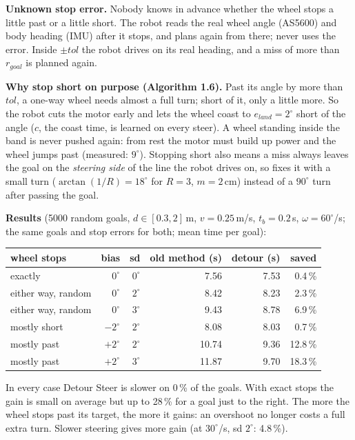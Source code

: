 \documentclass[11pt,a4paper]{article}
\begin{document}
{\noindent\textbf{Unknown stop error.} Nobody knows in advance whether the wheel stops a little past or a
little short. The robot reads the real wheel angle (AS5600) and body heading (IMU) after it stops, and
\FDetourSteer{} plans again from there; \FPlan{} never uses the error. Inside $\pm tol$ the robot drives on
its real heading, and a miss of more than $r_{goal}$ is planned again.

\smallskip
\noindent\textbf{Why stop short on purpose (Algorithm 1.6).} Past its angle by more than $tol$, a one-way wheel
needs almost a full turn; short of it, only a little more. So the robot cuts the motor early and lets the
wheel coast to $e_{land} = 2^\circ$ short of the angle ($c$, the coast time, is learned on every steer). A
wheel standing inside the band is never pushed again: from rest the motor must build up power and the
wheel jumps past (measured: $9^\circ$). Stopping short also means a miss always leaves the goal on the
\emph{steering side} of the line the robot drives on, so \FDriveReaim{} fixes it with a small turn
($\arctan(1/R) = 18^\circ$ for $R = 3$, $m = 2$\,cm) instead of a $90^\circ$ turn after passing the goal.

\smallskip
\noindent\textbf{Results} (5000 random goals, $d \in [0.3, 2]$\,m, $v = 0.25$\,m/s, $t_b = 0.2$\,s,
$\omega = 60^\circ$/s; the same goals and stop errors for both; mean time per goal):
\begin{center}
\begin{tabular}{lrrrrr}
\toprule
wheel stops & bias & sd & old method (s) & detour (s) & saved \\
\midrule
exactly             & $0^\circ$  & $0^\circ$ &  7.56 & 7.53 &  0.4\,\% \\
either way, random  & $0^\circ$  & $2^\circ$ &  8.42 & 8.23 &  2.3\,\% \\
either way, random  & $0^\circ$  & $3^\circ$ &  9.43 & 8.78 &  6.9\,\% \\
mostly short        & $-2^\circ$ & $2^\circ$ &  8.08 & 8.03 &  0.7\,\% \\
mostly past         & $+2^\circ$ & $2^\circ$ & 10.74 & 9.36 & 12.8\,\% \\
mostly past         & $+2^\circ$ & $3^\circ$ & 11.87 & 9.70 & 18.3\,\% \\
\bottomrule
\end{tabular}
\end{center}
\noindent In every case Detour Steer is slower on 0\,\% of the goals. With exact stops the gain is small on
average but up to 28\,\% for a goal just to the right. The more the wheel stops past its target, the more it
gains: an overshoot no longer costs a full extra turn. Slower steering gives more gain
(at $30^\circ$/s, sd $2^\circ$: 4.8\,\%).

}
\end{document}
